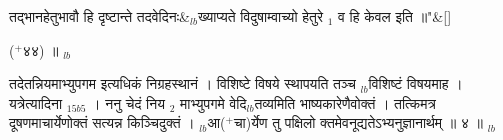 \documentclass[article,12pt,a4paper]{memoir}%
\newcommand{\add}[1]{($^{+}$#1)}
\newcounter{parCount}
\begin{document}
	    
	    \stanza[\smallbreak]
	  तद्भानहेतुभावौ हि दृष्टान्ते तदवेदिनः&{\tiny $_{lb}$}ख्याप्यते विदुषाम्वाच्यो हेतुरे {\tiny $_{1}$} व हि केवल इति ॥{\normalfontlatin\large\qquad{}"}\&[\smallbreak]
	  
	  
	  
	    \pstart  \leavevmode%
	    \hphantom{.}
	   \add{४४} ॥
	{}
	\pend%
      {\tiny $_{lb}$}

	  
	  \pstart \leavevmode%
	तदेतन्नियमाभ्युपगम इत्यधिकं निग्रहस्थानं । विशिष्टे विषये स्थापयति तञ्च {\tiny $_{lb}$}विशिष्टं विषयमाह । {\color{DodgerBlue3}यत्रेत्यादिना} {\tiny $_{15b5}$} । ननु चेदं निय {\tiny $_{2}$} माभ्युपगमे वेदि{\tiny $_{lb}$}तव्यमिति भाष्यकारेणैवोक्तं । तत्किमत्र दूषणमाचार्येणोक्तं सत्यन्न किञ्चिदुक्तं । {\tiny $_{lb}$}आ\add{चा}र्येण तु {\color{DodgerBlue3}पक्षिलो} क्तमेवनूद्यतेऽभ्यनुज्ञानार्थम् ॥ ४ ॥
	{}
	\pend%
      {\tiny $_{lb}$}
\end{document}
